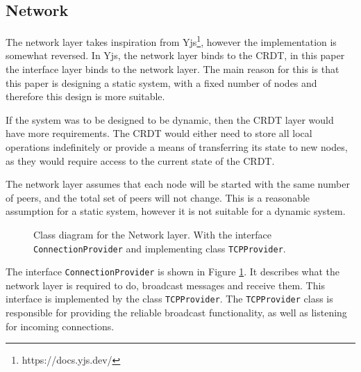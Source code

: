 \documentclass[12pt]{report}
\begin{document}
\subsection{Network}
The network layer takes inspiration from Yjs\footnote{https://docs.yjs.dev/}, however the implementation is somewhat reversed. In Yjs, the network layer binds to the CRDT, in this paper the interface layer binds to the network layer. The main reason for this is that this paper is designing a static system, with a fixed number of nodes and therefore this design is more suitable. \par

If the system was to be designed to be dynamic, then the CRDT layer would have more requirements. The CRDT would either need to store all local operations indefinitely or provide a means of transferring its state to new nodes, as they would require access to the current state of the CRDT.

The network layer assumes that each node will be started with the same number of peers, and the total set of peers will not change. This is a reasonable assumption for a static system, however it is not suitable for a dynamic system. \par

\begin{figure}[h]
    \centering
    \caption{Class diagram for the Network layer. With the interface \texttt{ConnectionProvider} and implementing class \texttt{TCPProvider}.}
    \label{fig:connection}
\end{figure}

The interface \texttt{ConnectionProvider} is shown in Figure \ref{fig:connection}. It describes what the network layer is required to do, broadcast messages and receive them. This interface is implemented by the class \texttt{TCPProvider}. The \texttt{TCPProvider} class is responsible for providing the reliable broadcast functionality, as well as listening for incoming connections. \par
\end{document}
